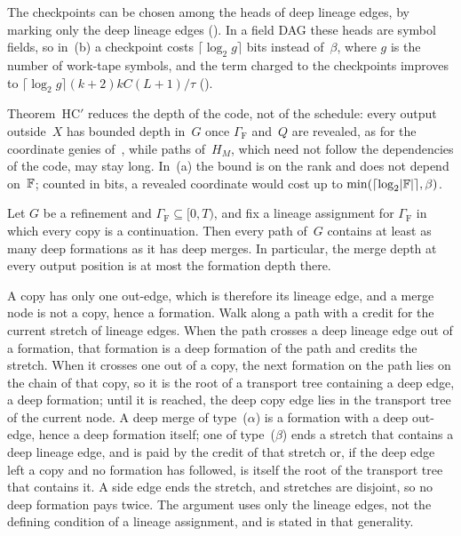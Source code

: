 \begin{outline}
The checkpoints can be chosen among the heads of deep lineage edges, by marking only the deep lineage edges
(). In a field DAG these heads are symbol fields, so in~(b) a checkpoint costs
$\lceil\log_2g\rceil$ bits instead of~$\beta$, where $g$ is the number of work-tape symbols, and the term charged to the
checkpoints improves to $\lceil\log_2g\rceil(k+2)kC(L+1)/\tau$ ().
\end{outline}

Theorem~HC$'$ reduces the depth of the code, not of the schedule: every output outside~$X$ has bounded depth in~$G$ once
$\Gamma_{\mathrm F}$ and~$Q$ are revealed, as for the coordinate genies of~\cite[Remark~7.6(c)]{BoundedNesting2026}, while
paths of~$H_M$, which need not follow the dependencies of the code, may stay long. In~(a) the bound is on the rank and
does not depend on~$\mathbb{F}$; counted in bits, a revealed coordinate would cost up to $\min(\lceil\log_2\lvert \mathbb{F} \rvert\rceil,\beta)$.

\begin{lemma}\label{lem:merge-formation}
Let $G$ be a refinement and $\Gamma_{\mathrm F}\subseteq[0,T)$, and fix a lineage assignment for $\Gamma_{\mathrm F}$ in
which every copy is a continuation. Then every path of~$G$ contains at least as many deep formations as it has deep
merges. In particular, the merge depth at every output position is at most the formation depth there.
\end{lemma}

\begin{outline}
A copy has only one out-edge, which is therefore its lineage edge, and a merge node is not a copy, hence a formation.
Walk along a path with a credit for the current stretch of lineage edges. When the path crosses a deep lineage edge out
of a formation, that formation is a deep formation of the path and credits the stretch. When it crosses one out of a
copy, the next formation on the path lies on the chain of that copy, so it is the root of a transport tree containing a
deep edge, a deep formation; until it is reached, the deep copy edge lies in the transport tree of the current node. A
deep merge of type~($\alpha$) is a formation with a deep out-edge, hence a deep formation itself; one of type~($\beta$)
ends a stretch that contains a deep lineage edge, and is paid by the credit of that stretch or, if the deep edge left a
copy and no formation has followed, is itself the root of the transport tree that contains it. A side edge ends the
stretch, and stretches are disjoint, so no deep formation pays twice. The argument uses only the lineage edges, not the
defining condition of a lineage assignment, and  is stated in that
generality.
\end{outline}

